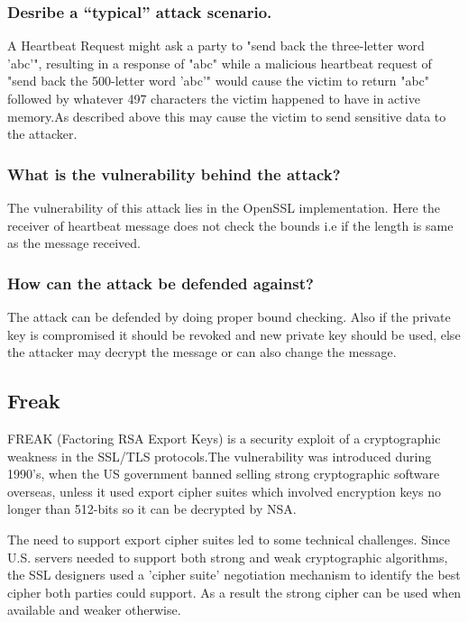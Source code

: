 \documentclass{article}
\begin{document}
\subsubsection{Desribe a “typical” attack scenario.}
\indent \indent A Heartbeat Request might ask a party to "send back the three-letter word 'abc'", resulting in a response of "abc" while a  malicious heartbeat request of "send back the 500-letter word 'abc'" would cause the victim to return "abc" followed by whatever 497 characters the victim happened to have in active memory.As described above this may cause the victim to send sensitive data to the attacker.

\subsubsection{What is the vulnerability behind the attack?}
\indent \indent The vulnerability of this attack lies in the OpenSSL implementation. Here the receiver of heartbeat message does not check the bounds i.e if the length is same as the message received.


\subsubsection{How can the attack be defended against?}
\indent \indent The attack can be defended by doing proper bound checking. Also if the private key is compromised it should be revoked and new private key should be used, else the attacker may decrypt the message or can also change the message.

\subsection{Freak}
\indent \indent FREAK (Factoring RSA Export Keys) is a security exploit of a cryptographic weakness in the SSL/TLS protocols.The vulnerability was introduced during 1990's, when the US government banned selling strong cryptographic software overseas, unless it used export cipher suites which involved encryption keys no longer than 512-bits so it can be decrypted by NSA.

The need to support export cipher suites led to some technical challenges. Since U.S. servers needed to support both strong and weak cryptographic algorithms, the SSL designers used a 'cipher suite' negotiation mechanism to identify the best cipher both parties could support. As a result the strong cipher can be used when available and weaker otherwise.
\end{document}
